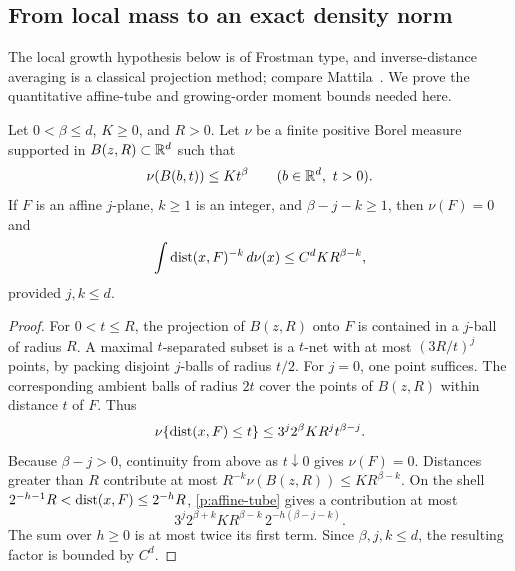 \subsection{From local mass to an exact density norm}

The local growth hypothesis below is of Frostman type, and
inverse-distance averaging is a classical projection method; compare
Mattila~\cite[Lemma~5.1, p.~236, and Theorem~5.4, p.~237]{Mattila1975}.
We prove the quantitative affine-tube and growing-order moment bounds
needed here.

\begin{lemma}\label{p:affine-inverse}
Let \(0<\beta\le d\), \(K\ge0\), and \(R>0\). Let \(\nu\) be a finite
positive Borel measure supported in \(B(z,R)\subset\mathbb R^d\) such that
\begin{equation}\label{p:all-ball-mass}
 \nu(B(b,t))\le Kt^\beta
 \qquad(b\in\mathbb R^d,\ t>0).
\end{equation}
If \(F\) is an affine \(j\)-plane, \(k\ge1\) is an integer, and
\(\beta-j-k\ge1\), then \(\nu(F)=0\) and
\begin{equation}\label{p:affine-inverse-bound}
 \int\operatorname{dist}(x,F)^{-k}\,d\nu(x)\le C^d K R^{\beta-k},
\end{equation}
provided \(j,k\le d\).
\end{lemma}

\begin{proof}
For \(0<t\le R\), the projection of \(B(z,R)\) onto \(F\) is contained
in a \(j\)-ball of radius \(R\). A maximal \(t\)-separated subset is a
\(t\)-net with at most \((3R/t)^j\) points, by packing disjoint
\(j\)-balls of radius \(t/2\). For \(j=0\), one point suffices.
The corresponding ambient balls of radius \(2t\) cover the points of
\(B(z,R)\) within distance \(t\) of \(F\). Thus
\begin{equation}\label{p:affine-tube}
 \nu\{\operatorname{dist}(x,F)\le t\}\le 3^j2^\beta K R^j t^{\beta-j}.
\end{equation}
Because \(\beta-j>0\), continuity from above as \(t\downarrow0\)
gives \(\nu(F)=0\). Distances greater than \(R\) contribute at most
\(R^{-k}\nu(B(z,R))\le KR^{\beta-k}\). On the shell
\(2^{-h-1}R<\operatorname{dist}(x,F)\le2^{-h}R\), \eqref{p:affine-tube} gives a
contribution at most
\[
 3^j2^{\beta+k}KR^{\beta-k}\,2^{-h(\beta-j-k)}.
\]
The sum over \(h\ge0\) is at most twice its first term. Since
\(\beta,j,k\le d\), the resulting factor is bounded by \(C^d\).
\end{proof}

